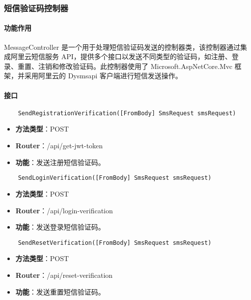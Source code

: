 \subsubsection{短信验证码控制器}

\paragraph{功能作用}

MessageController 是一个用于处理短信验证码发送的控制器类，该控制器通过集成阿里云短信服务 API，提供多个接口以发送不同类型的验证码，如注册、登录、重置、注销和修改验证码。此控制器使用了 Microsoft.AspNetCore.Mvc 框架，并采用阿里云的 Dysmsapi 客户端进行短信发送操作。

\paragraph{接口}

\begin{verbatim}
	SendRegistrationVerification([FromBody] SmsRequest smsRequest)
\end{verbatim}

\begin{itemize}
	\item \textbf{方法类型}：POST
	\item \textbf{Router}：/api/get-jwt-token
	\item \textbf{功能}：发送注册短信验证码。
\end{itemize}

\begin{verbatim}
	SendLoginVerification([FromBody] SmsRequest smsRequest)
\end{verbatim}

\begin{itemize}
	\item \textbf{方法类型}：POST
	\item \textbf{Router}：/api/login-verification
	\item \textbf{功能}：发送登录短信验证码。
\end{itemize}

\begin{verbatim}
	SendResetVerification([FromBody] SmsRequest smsRequest)
\end{verbatim}

\begin{itemize}
	\item \textbf{方法类型}：POST
	\item \textbf{Router}：/api/reset-verification
	\item \textbf{功能}：发送重置短信验证码。
\end{itemize}

